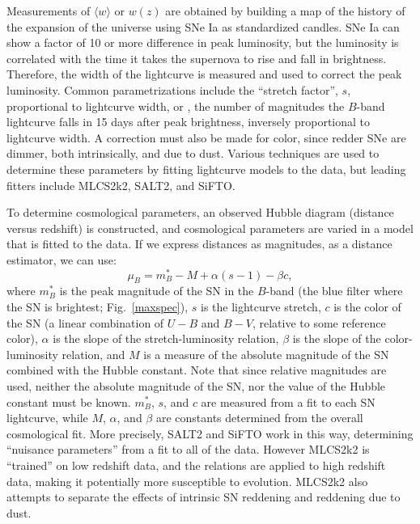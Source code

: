 \documentclass{nature1}
\begin{document}
Measurements of $\langle w \rangle$ or $w(z)$ are obtained by building
a map of the history of the expansion of the universe using SNe Ia as
standardized candles.  SNe Ia can show a factor of 10 or more
difference in peak luminosity, but the luminosity is correlated with
the time it takes the supernova to rise and fall in
brightness\citep{1993ApJ...413L.105P}.  Therefore, the width of the
lightcurve is measured and used to correct the peak luminosity.
Common parametrizations include the ``stretch
factor\citep{1997ApJ...483..565P}'', $s$, proportional to lightcurve
width, or \drp , the number of magnitudes the $B$-band lightcurve
falls in 15 days after peak brightness, inversely proportional to
lightcurve width\citep{1993ApJ...413L.105P}.  A correction must also
be made for color, since redder SNe are dimmer, both intrinsically,
and due to dust\citep{1996ApJ...473...88R,2007ApJ...664L..13C}.
Various techniques are used to determine these parameters by fitting
lightcurve models to the data, but leading fitters include
MLCS2k2\citep{2007ApJ...659..122J}, SALT2\citep{2007A&A...466...11G},
and SiFTO\citep{2008ApJ...681..482C}.

To determine cosmological parameters, an observed Hubble diagram
(distance versus redshift) is constructed, and cosmological parameters
are varied in a model that is fitted to the data.  If we express
distances as magnitudes, as a distance estimator, we can
use\citep{2006A&A...447...31A}:
$$\mu_B=m^*_B-M+\alpha (s-1)-\beta c,$$ 
where $m^*_B$ is the peak magnitude of the SN in the $B$-band (the blue filter where the SN is brightest; Fig.~\ref{maxspec}), $s$ is the lightcurve stretch, $c$ is
the color of the SN (a linear combination of $U-B$ and $B-V$, relative
to some reference
color\citep{2006A&A...447...31A,2008ApJ...681..482C}), $\alpha$ is the
slope of the stretch-luminosity relation, $\beta $ is the slope of the
color-luminosity relation, and $M$ is a measure of the absolute
magnitude of the SN combined with the Hubble constant.  Note that
since relative magnitudes are used, neither the absolute magnitude of
the SN, nor the value of the Hubble constant must be known.  $m^*_B$,
$s$, and $c$ are measured from a fit to each SN lightcurve, while $M$,
$\alpha $, and $\beta$ are constants determined from the overall
cosmological fit.  More precisely, SALT2 and SiFTO work in this way,
determining ``nuisance parameters'' from a fit to all of the data.
However MLCS2k2 is ``trained'' on low redshift data, and the relations
are applied to high redshift data, making it potentially more
susceptible to evolution.  MLCS2k2 also attempts to separate the
effects of intrinsic SN reddening and reddening due to dust.
\end{document}
